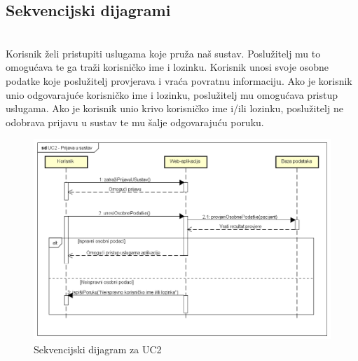 			\newpage
			\subsection{Sekvencijski dijagrami}
				
				\textbf{}\\
				
				Korisnik želi pristupiti uslugama koje pruža naš sustav. Poslužitelj mu to omogućava te ga traži korisničko ime i lozinku. Korisnik unosi svoje osobne podatke koje poslužitelj provjerava i vraća povratnu informaciju. Ako je korisnik unio odgovarajuće korisničko ime i lozinku, poslužitelj mu omogućava pristup uslugama. Ako je korisnik unio krivo korisničko ime i/ili lozinku, poslužitelj ne odobrava prijavu u sustav te mu šalje odgovarajuću poruku.
				
				\begin{figure}[H]
					\includegraphics[scale=0.6]{slike/UC2_Prijava_u_sustav}
					\centering
					\caption{Sekvencijski dijagram za UC2}
				\end{figure}
				
			\newpage
				
				\textbf{}\\
				
